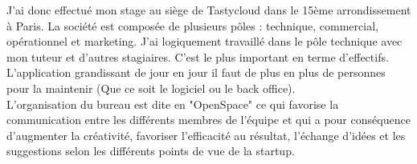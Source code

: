 J'ai donc effectué mon stage au siège de Tastycloud dans le 15ème arrondissement à Paris. La société est composée de plusieurs pôles : technique, commercial, opérationnel et marketing. J'ai logiquement travaillé dans le pôle technique avec mon tuteur et d'autres stagiaires. C'est le plus important en terme d'effectifs. L'application grandissant de jour en jour il faut de plus en plus de personnes pour la maintenir (Que ce soit le logiciel ou le back office).\\

L'organisation du bureau est dite en "OpenSpace" ce qui favorise la communication entre les différents membres de l'équipe et qui a pour conséquence d’augmenter la créativité, favoriser l’efficacité au résultat, l'échange d'idées et les suggestions selon les différents points de vue de la startup.

